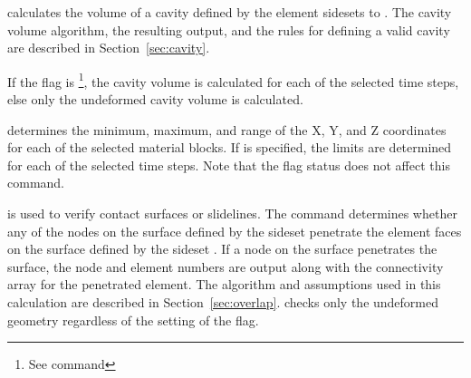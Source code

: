  {
 calculates the volume of a cavity defined by the element
sidesets  to .  The cavity volume
algorithm, the resulting output, and the rules for defining a valid
cavity are described in Section~\ref{sec:cavity}.

If the  flag is \footnote{See command
}, the cavity volume is calculated for each of the selected
time steps, else only the undeformed cavity volume is calculated.
}

 {
 determines the minimum, maximum, and range of the
X, Y, and Z coordinates for each of the selected material blocks.
If  is specified, the limits are determined for each of
the selected time steps.  Note that the  flag status does
not affect this command.
}

 {
 is used to verify contact surfaces or slidelines.  The
command determines whether any of the nodes on the surface defined by
the sideset  penetrate the element faces on the surface
defined by the sideset .  If a node on the
 surface penetrates the  surface, the
node and element numbers are output along with the connectivity array
for the penetrated element. The algorithm and assumptions used in this
calculation are described in Section~\ref{sec:overlap}.  
checks only the undeformed geometry regardless of the setting of the
 flag.
}

